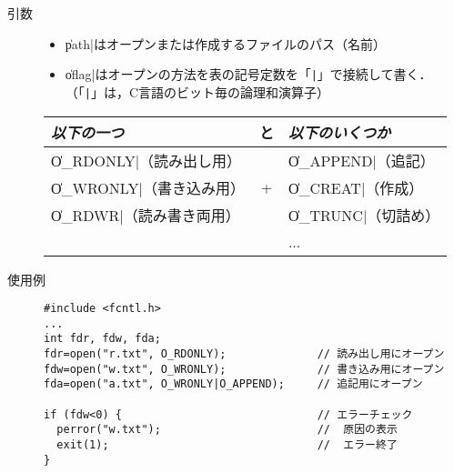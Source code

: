 \documentclass{beamer}                 %
\begin{document}
\begin{frame}[fragile]
\begin{description}
\item[引数]
\begin{itemize}
\item \|path|はオープンまたは作成するファイルのパス（名前）
\item \|oflag|はオープンの方法を表の記号定数を「\texttt{|}」で接続して書く．
（「\texttt{|}」は，C言語のビット毎の論理和演算子）
\end{itemize}

{\footnotesize\begin{tabular}{l | c | l}
\hline\hline
\emph{以下の一つ} & と & \emph{以下のいくつか} \\\hline
\|O_RDONLY|（読み出し用） &    & \|O_APPEND|（追記）  \\
\|O_WRONLY|（書き込み用） & +  & \|O_CREAT|（作成）   \\
\|O_RDWR|（読み書き両用） &    & \|O_TRUNC|（切詰め） \\
                      &    & ...      \\
\end{tabular}}

\item[使用例]
\begin{lstlisting}[numbers=none]
#include <fcntl.h>
...
int fdr, fdw, fda;
fdr=open("r.txt", O_RDONLY);              // 読み出し用にオープン
fdw=open("w.txt", O_WRONLY);              // 書き込み用にオープン
fda=open("a.txt", O_WRONLY|O_APPEND);     // 追記用にオープン

if (fdw<0) {                              // エラーチェック
  perror("w.txt");                        //  原因の表示
  exit(1);                                //  エラー終了
}
\end{lstlisting}
\end{description}
\end{frame}
\end{document}
